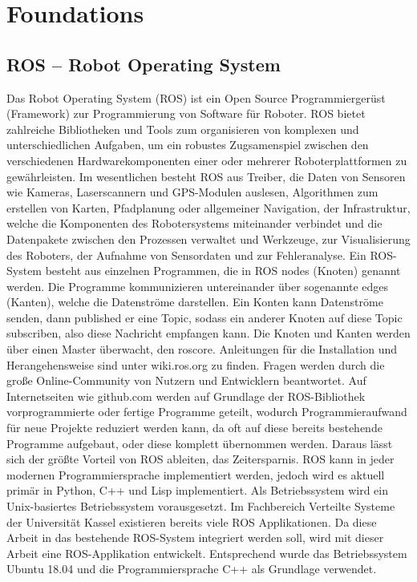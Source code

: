\chapter{Foundations}
\label{sec:foundations}

\section{ROS – Robot Operating System}
\label{sec:ros}

Das Robot Operating System (ROS) ist ein Open Source Programmiergerüst (Framework)  zur Programmierung von Software für Roboter. ROS bietet zahlreiche Bibliotheken und Tools zum organisieren von komplexen und unterschiedlichen Aufgaben, um ein robustes Zugsamenspiel zwischen den verschiedenen Hardwarekomponenten einer oder mehrerer Roboterplattformen zu gewährleisten.  Im wesentlichen besteht ROS aus Treiber, die Daten von Sensoren wie Kameras, Laserscannern und GPS-Modulen auslesen, Algorithmen zum erstellen von Karten, Pfadplanung oder allgemeiner Navigation, der Infrastruktur, welche die Komponenten des Robotersystems miteinander verbindet und die Datenpakete zwischen den Prozessen verwaltet und Werkzeuge, zur Visualisierung des Roboters, der Aufnahme von Sensordaten und zur Fehleranalyse. 
Ein ROS-System besteht aus einzelnen Programmen, die in ROS nodes (Knoten) genannt werden. Die Programme kommunizieren untereinander über sogenannte edges (Kanten), welche die Datenströme darstellen. Ein Konten kann Datenströme senden, dann published er eine Topic, sodass ein anderer Knoten auf diese Topic subscriben, also diese Nachricht empfangen kann. Die Knoten und Kanten werden über einen Master überwacht, den roscore. 
Anleitungen für die Installation und Herangehensweise sind unter wiki.ros.org zu finden. Fragen werden durch die große Online-Community von Nutzern und Entwicklern beantwortet. 
Auf Internetseiten wie github.com werden auf Grundlage der ROS-Bibliothek vorprogrammierte oder fertige Programme geteilt, wodurch Programmieraufwand für neue Projekte reduziert werden kann, da oft auf diese bereits bestehende Programme aufgebaut, oder diese komplett übernommen werden. Daraus lässt sich der größte Vorteil von ROS ableiten, das Zeitersparnis.
ROS kann in jeder modernen Programmiersprache implementiert werden, jedoch wird es aktuell primär in Python, C++ und Lisp implementiert. Als Betriebssystem wird ein Unix-basiertes Betriebssystem vorausgesetzt. 
Im Fachbereich Verteilte Systeme der Universität Kassel existieren bereits viele ROS Applikationen. Da diese Arbeit in das bestehende ROS-System integriert werden soll, wird mit dieser Arbeit eine ROS-Applikation entwickelt. Entsprechend wurde das Betriebssystem Ubuntu 18.04 und die Programmiersprache C++ als Grundlage verwendet. 





